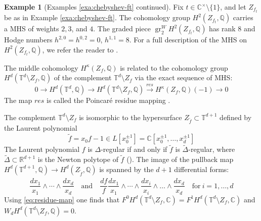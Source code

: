 \documentclass[11pt, reqno]{amsart}
\theoremstyle{plain}
\theoremstyle{definition}
\newtheorem{example}[thm]{Example}
\newcommand{\CC}{\mathbb{C}}
\newcommand{\QQ}{\mathbb{Q}}
\newcommand{\RR}{\mathbb{R}}
\newcommand{\TT}{\mathbb{T}}
\DeclareMathOperator{\gr}{gr}
\begin{document}
\begin{example}[Examples \ref{exa:chebyshev-ft} continued]
\label{exa:chebyshev-hodge}
Fix $t\in \CC^\times \setminus \{ 1\}$, and let $Z_{f_t}$ be as in Example \ref{exa:chebyshev-ft}. The cohomology group $H^{2}(Z_{f_t},\QQ)$ carries a MHS of weights
$2,3$, and $4$.
The graded piece $\gr_2^W H^{2}(Z_{f_t},\QQ)$ 
has rank $8$ and Hodge numbers $h^{2,0}=h^{0,2}=0$,  $h^{1,1}=8$.
For a full description of the MHS on $H^{2}(Z_{f_t},\QQ)$, we refer the reader to  \cite[Section 4]{FRV-duke}.
\end{example}
\smallskip

The middle cohomology $H^\kappa(Z_f, \QQ)$ is related to the cohomology group $H^d(\TT^d \setminus Z_f, \QQ)$ of the complement $\TT^d \setminus Z_f$ 
via the exact sequence of MHS:
\begin{equation}
\label{eq:residue-map}
0 \to H^d(\TT^d,\QQ) \to H^{d}(\TT^d \setminus Z_f,\QQ) \xrightarrow{res} H^{\kappa}(Z_f,\QQ)(-1) \to  0
\end{equation}
The map $res$ is called the Poincar\'e residue mapping \cite[Section 5]{Batyrev-tori}.


The complement $\TT^d \setminus Z_f$ is isomorphic to the hypersurface $Z_{\widetilde{f}} \subset \TT^{d+1}$ defined by the Laurent polynomial \[\widetilde{f}=x_0f-1 \in L[x_0^{\pm 1}]=\CC[x_0^{\pm 1}, \dots, x_d^{\pm 1}]\]
The Laurent polynomial $f$ is $\Delta$-regular if and only if $\widetilde{f}$ is $\widetilde{\Delta}$-regular, where $\widetilde{\Delta} \subset \RR^{d+1}$ is  the Newton polytope of $\widetilde{f}$ (\cite[Proposition 4.2]{Batyrev-tori}). 
The image of the pullback map $H^{d}(\TT^{d+1}, \QQ) \to H^d(Z_{\widetilde{f}},\QQ)$ is spanned by the $d+1$ differential forms:
\[
\frac{dx_1}{x_1} \wedge \cdots \wedge \frac{dx_d}{x_d}  \quad \text{and} \quad  \frac{df}{f} \frac{dx_1}{x_1} \wedge \cdots\wedge\widehat{\frac{dx_i}{x_i}}\wedge \dots  \wedge \frac{dx_d}{x_d}  \quad \text{for} \ i=1, \dots, d
\]
Using \eqref{eq:residue-map} one finds that  \mbox{$F^0 H^{d}(\TT^d \setminus Z_f,\CC)=F^1 H^{d}(\TT^d \setminus Z_f,\CC)$} and $W_d H^{d}(\TT^d \setminus Z_f,\QQ)=0$. 
\smallskip
\end{document}
